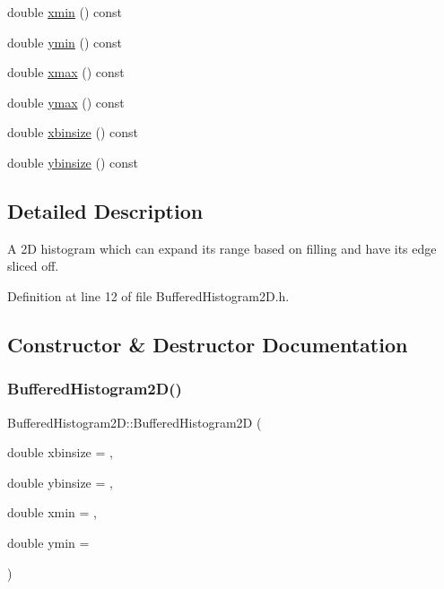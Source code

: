 \begin{DoxyCompactItemize}
\item 
double \hyperlink{class_wire_cell_1_1_buffered_histogram2_d_a282c0f0144e547a7893760993461d4d7}{xmin} () const
\item 
double \hyperlink{class_wire_cell_1_1_buffered_histogram2_d_a772cc0d25c6cf84beb629960d5e3e440}{ymin} () const
\item 
double \hyperlink{class_wire_cell_1_1_buffered_histogram2_d_ae993317d293e8e80541958c481e90977}{xmax} () const
\item 
double \hyperlink{class_wire_cell_1_1_buffered_histogram2_d_af0286addd8f7124fa4def025db6038d4}{ymax} () const
\item 
double \hyperlink{class_wire_cell_1_1_buffered_histogram2_d_a3c2df0d26df3d418fe85d01ac21bf868}{xbinsize} () const
\item 
double \hyperlink{class_wire_cell_1_1_buffered_histogram2_d_abb36fbf4ad399b56d7c72556e596a7c4}{ybinsize} () const
\end{DoxyCompactItemize}


\subsection{Detailed Description}
A 2D histogram which can expand its range based on filling and have its edge sliced off. 

Definition at line 12 of file Buffered\+Histogram2\+D.\+h.



\subsection{Constructor \& Destructor Documentation}
\mbox{\label{class_wire_cell_1_1_buffered_histogram2_d_a152ca655ff3547703ea3c41849af83aa}} 
\subsubsection{\texorpdfstring{Buffered\+Histogram2\+D()}{BufferedHistogram2D()}}
{\footnotesize\ttfamily Buffered\+Histogram2\+D\+::\+Buffered\+Histogram2D (\begin{DoxyParamCaption}\item[{double}]{xbinsize = {},  }\item[{double}]{ybinsize = {},  }\item[{double}]{xmin = {},  }\item[{double}]{ymin = {} }\end{DoxyParamCaption})}

